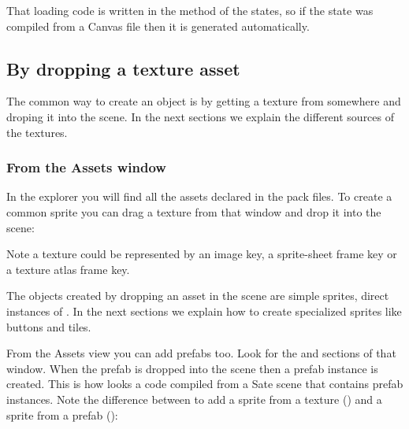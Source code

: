 \documentclass[letterpaper,10pt,english]{sphinxmanual}
\begin{document}
That loading code is written in the  method of the states, so if the state was compiled from a Canvas file then it is generated automatically.


\subsection{By dropping a texture asset}
\label{\detokenize{canvas:by-dropping-a-texture-asset}}
The common way to create an object is by getting a texture from somewhere and droping it into the scene. In the next sections we explain the different sources of the textures.


\subsubsection{From the Assets window}
\label{\detokenize{canvas:from-the-assets-window}}
In the  explorer you will find all the assets declared in the pack files. To create a common sprite you can drag a texture from that window and drop it into the scene:

\noindent{}

Note a texture could be represented by an image key, a sprite-sheet frame key or a texture atlas frame key.

The objects created by dropping an asset in the scene are simple sprites, direct instances of . In the next sections we explain how to create specialized sprites like buttons and tiles.

From the Assets view you can add prefabs too. Look for the  and  sections of that window. When the prefab is dropped into the scene then a prefab instance is created. This is how looks a code compiled from a Sate scene that contains prefab instances. Note the difference between to add a sprite from a texture () and a sprite from a prefab ():

\begin{sphinxVerbatim}[commandchars=\\\{\}]
    
          

            
         
\end{sphinxVerbatim}
\end{document}
